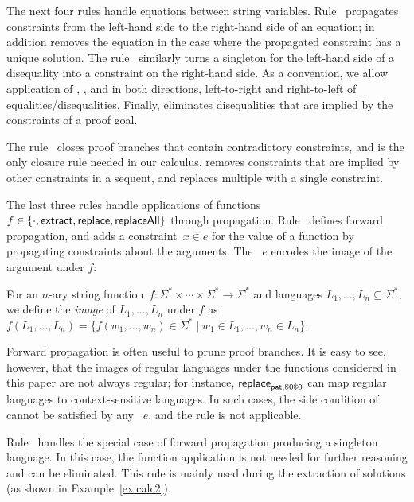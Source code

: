 The next four rules handle equations between string
variables. Rule~ propagates \regexp{} constraints from
the left-hand side to the right-hand side of an equation;
 in addition removes the equation in the case
where the propagated constraint has a unique solution. The
rule~ similarly turns a singleton \regexp{}
for the left-hand side of a disequality into a \regexp{} constraint on the
right-hand side.  As a convention, we allow application of
, , and
 in both directions, left-to-right and
right-to-left of equalities/disequalities. Finally,  eliminates
disequalities that are implied by the \regexp{} constraints of a proof
goal.

The rule~ closes proof branches that contain
contradictory \regexp{} constraints, and is the only closure rule needed
in our calculus.  removes \regexp{} constraints
that are implied by other constraints in a sequent, and
 replaces multiple \regexps{} with a single
constraint.

The last three rules handle applications of functions
$f \in \{\cdot, \mathsf{extract}, \mathsf{replace}, \mathsf{replaceAll}\}$ through
propagation. Rule~ defines forward propagation, and
adds a \regexp{} constraint~$x \in e$ for the value of a function by
propagating constraints about the arguments. The \regexp{}~$e$ encodes
the image of the argument \regexps{} under $f$:
%
\begin{definition}[Image]
  For an $n$-ary string
  function~$f : \Sigma^* \times \cdots \times \Sigma^* \to \Sigma^*$
  and languages $L_1, \ldots, L_n \subseteq \Sigma^*$, we define the
  \emph{image} of $L_1, \ldots, L_n$ under $f$ as
  $f(L_1, \ldots, L_n) = \{f(w_1, \ldots, w_n) \in \Sigma^* \mid w_1
  \in L_1, \ldots, w_n \in L_n \}$.
\end{definition}

Forward propagation is often useful to prune proof branches. It is
easy to see, however, that the images of regular languages under the
functions considered in this paper are not always regular; for
instance, $\mathsf{replace}_{\mathsf{pat},\$0\$0}$ can map regular languages to
context-sensitive languages. In such cases, the side condition of
 cannot be satisfied by any \regexp{}~$e$, and the rule
is not applicable.

Rule~ handles the special case of forward
propagation producing a singleton language. In this case, the function
application is not needed for further reasoning and can be
eliminated. This rule is mainly used during the extraction of
solutions (as shown in Example~\ref{ex:calc2}).


